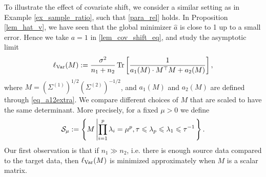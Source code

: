 To illustrate the effect of covariate shift, we consider a similar setting as in Example \ref{ex_sample_ratio}, such that \eqref{para_rel} holds. In Proposition \ref{lem_hat_v}, we have seen that the global minimizer $\hat a$ is close to 1 up to a small error. Hence we take $a=1$ in \eqref{lem_cov_shift_eq}, and study the asymptotic limit
$$\ell_{\operatorname{Var}}(M):= \frac{\sigma^2}{n_1+n_2}\operatorname{Tr}\left[  \frac{1}{a_1(M) \cdot M^\top M + a_2(M)  }  \right], $$
where $ M=(\Sigma^{(1)})^{1/2}(\Sigma^{(2)})^{-1/2}$, and $a_1(M)$ and $a_2(M)$ are defined through \eqref{eq_a12extra}.
We compare different choices of $M$ that are scaled to have the same determinant. More precisely, for a fixed $\mu>0$ we define
\begin{align*}
		\cS_{\mu}\define\bigset{M \left| \prod_{i=1}^p \lambda_i = \mu^p, \tau \le \lambda_p \le \lambda_1 \le \tau^{-1}\right.}.
\end{align*}
Our first observation is that if $n_1 \gg n_2$, i.e. there is enough source data compared to the target data, then $\ell_{\operatorname{Var}}(M)$ is minimized approximately when $M$ is a scalar matrix.
